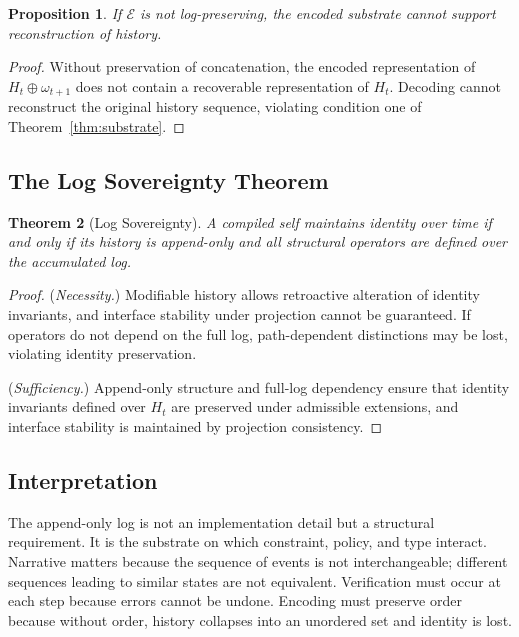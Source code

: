 \documentclass[12pt, a4paper]{article}
\theoremstyle{plain}
\newtheorem{theorem}{Theorem}[section]
\newtheorem{proposition}[theorem]{Proposition}
\theoremstyle{definition}
\theoremstyle{remark}
\begin{document}
\begin{proposition}
If $\mathcal{E}$ is not log-preserving, the encoded substrate cannot support reconstruction of history.
\end{proposition}

\begin{proof}
Without preservation of concatenation, the encoded representation of $H_t \oplus \omega_{t+1}$ does not contain a recoverable representation of $H_t$. Decoding cannot reconstruct the original history sequence, violating condition one of Theorem~\ref{thm:substrate}.
\end{proof}

\subsection{The Log Sovereignty Theorem}

\begin{theorem}[Log Sovereignty]
A compiled self maintains identity over time if and only if its history is append-only and all structural operators are defined over the accumulated log.
\end{theorem}

\begin{proof}
(\textit{Necessity.}) Modifiable history allows retroactive alteration of identity invariants, and interface stability under projection cannot be guaranteed. If operators do not depend on the full log, path-dependent distinctions may be lost, violating identity preservation.

(\textit{Sufficiency.}) Append-only structure and full-log dependency ensure that identity invariants defined over $H_t$ are preserved under admissible extensions, and interface stability is maintained by projection consistency.
\end{proof}

\subsection{Interpretation}

The append-only log is not an implementation detail but a structural requirement. It is the substrate on which constraint, policy, and type interact. Narrative matters because the sequence of events is not interchangeable; different sequences leading to similar states are not equivalent. Verification must occur at each step because errors cannot be undone. Encoding must preserve order because without order, history collapses into an unordered set and identity is lost.
\end{document}
